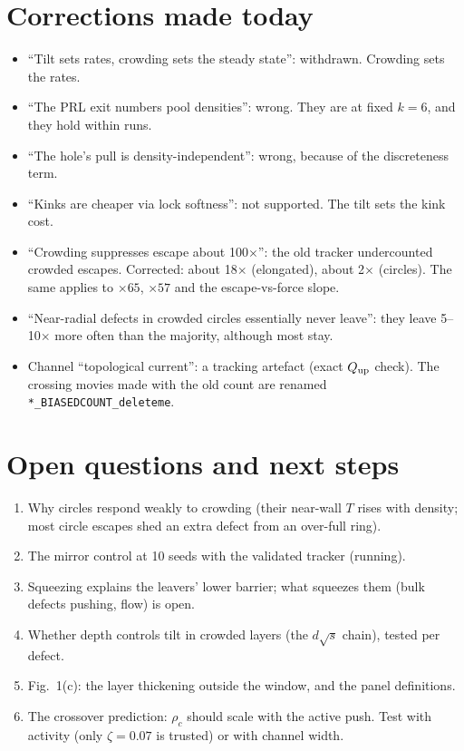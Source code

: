 \documentclass[11pt,a4paper]{article}
\begin{document}
\section{Corrections made today}
\begin{itemize}
\item ``Tilt sets rates, crowding sets the steady state'': withdrawn. Crowding sets the rates.
\item ``The PRL exit numbers pool densities'': wrong. They are at fixed $k=6$, and they hold within runs.
\item ``The hole's pull is density-independent'': wrong, because of the discreteness term.
\item ``Kinks are cheaper via lock softness'': not supported. The tilt sets the kink cost.
\item ``Crowding suppresses escape about 100$\times$'': the old tracker undercounted crowded escapes. Corrected: about 18$\times$ (elongated), about 2$\times$ (circles). The same applies to $\times65$, $\times57$ and the escape-vs-force slope.
\item ``Near-radial defects in crowded circles essentially never leave'': they leave 5--10$\times$ more often than the majority, although most stay.
\item Channel ``topological current'': a tracking artefact (exact $Q_{\rm up}$ check). The crossing movies made with the old count are renamed \texttt{*\_BIASEDCOUNT\_deleteme}.
\end{itemize}

\section{Open questions and next steps}
\begin{enumerate}
\item Why circles respond weakly to crowding (their near-wall $T$ rises with density; most circle escapes shed an extra defect from an over-full ring).
\item The mirror control at 10 seeds with the validated tracker (running).
\item Squeezing explains the leavers' lower barrier; what squeezes them (bulk defects pushing, flow) is open.
\item Whether depth controls tilt in crowded layers (the $d\sqrt s$ chain), tested per defect.
\item Fig.~1(c): the layer thickening outside the window, and the panel definitions.
\item The crossover prediction: $\rho_c$ should scale with the active push. Test with activity (only $\zeta=0.07$ is trusted) or with channel width.
\end{enumerate}
\end{document}
